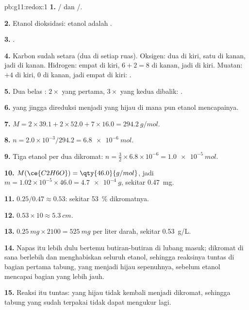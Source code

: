 \begin{solution}{pb:g11:redox:1}
\textbf{1.} / dan /.

\textbf{2.} Etanol dioksidasi: etanol adalah .

\textbf{3.} .

\textbf{4.} Karbon sudah setara (dua di setiap ruas). Oksigen: dua di
kiri, satu di kanan, jadi  di kanan. Hidrogen: empat di kiri,
$6 + 2 = 8$ di kanan, jadi  di kiri. Muatan: $+4$ di kiri, 0 di
kanan, jadi empat  di kiri:
.

\textbf{5.} Dua belas : $2\times$ yang pertama, $3\times$ yang
kedua dibalik:
.

\textbf{6.}   yang jingga direduksi menjadi 
 yang hijau di mana pun etanol mencapainya.

\textbf{7.} $M = 2\times 39.1 + 2\times 52.0 + 7\times 16.0 =
\qty{294.2}{g/mol}$.

\textbf{8.} $n = 2.0\times 10^{-3}/294.2 = \qty{6.8e-6}{mol}$.

\textbf{9.} Tiga  etanol per dua  dikromat:
$n = \tfrac{3}{2}\times 6.8\times 10^{-6} = \qty{1.0e-5}{mol}$.

\textbf{10.} $M(\ce{C2H6O}) = \qty{46.0}{g/mol}$, jadi
$m = 1.02\times 10^{-5}\times 46.0 = \qty{4.7e-4}{g}$, sekitar
\qty{0.47}{mg}.

\textbf{11.} $0.25/0.47 \approx 0.53$: sekitar \qty{53}{\percent}
dikromatnya.

\textbf{12.} $0.53 \times 10 \approx \qty{5.3}{cm}$.

\textbf{13.} $\qty{0.25}{mg} \times 2100 = \qty{525}{mg}$ per liter
darah, sekitar \qty{0.53}{g/L}.

\textbf{14.} Napas itu lebih dulu bertemu butiran-butiran di lubang
masuk; dikromat di sana berlebih dan menghabiskan seluruh etanol,
sehingga reaksinya tuntas di bagian pertama tabung, yang menjadi hijau
sepenuhnya, sebelum etanol mencapai bagian yang lebih jauh.

\textbf{15.} Reaksi itu tuntas:   yang hijau tidak
kembali menjadi dikromat, sehingga tabung yang sudah terpakai tidak dapat
mengukur lagi.


\end{solution}
